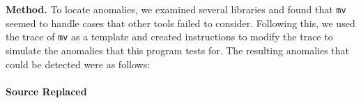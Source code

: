 
{\bf Method.}  To locate anomalies, 
we examined several libraries and found that {\tt mv} seemed
to handle cases that other tools failed to consider.  Following this, we 
used the trace of {\tt mv} as a template and created instructions to modify
the trace to simulate the anomalies that this program tests for.
The resulting anomalies that could be detected were as follows:


%

\paragraph{Source Replaced}

